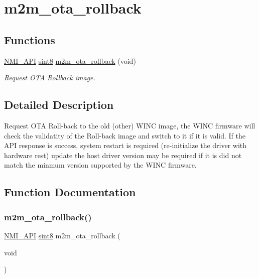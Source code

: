 \hypertarget{group__OtaRollbackfn}{}\section{m2m\+\_\+ota\+\_\+rollback}
\label{group__OtaRollbackfn}
\subsection*{Functions}
\begin{DoxyCompactItemize}
\item 
\hyperlink{group__BSPDefine_gaecc0323d771e41ef81a76b5f12783e22}{N\+M\+I\+\_\+\+A\+PI} \hyperlink{group__DataT_gae35f10ffd0ac8dd2bc3e794da9bdfbc7}{sint8} \hyperlink{group__OtaRollbackfn_gafdc5f0bb3d2a23b787816494ba1e5a48}{m2m\+\_\+ota\+\_\+rollback} (void)
\begin{DoxyCompactList}\small\item\em Request O\+TA Rollback image. \end{DoxyCompactList}\end{DoxyCompactItemize}


\subsection{Detailed Description}
Request O\+TA Roll-\/back to the old (other) W\+I\+NC image, the W\+I\+NC firmware will check the validatity of the Roll-\/back image and switch to it if it is valid. If the A\+PI response is success, system restart is required (re-\/initialize the driver with hardware rest) update the host driver version may be required if it is did not match the minmum version supported by the W\+I\+NC firmware. 

\subsection{Function Documentation}
\mbox{\label{group__OtaRollbackfn_gafdc5f0bb3d2a23b787816494ba1e5a48}} 
\subsubsection{\texorpdfstring{m2m\+\_\+ota\+\_\+rollback()}{m2m\_ota\_rollback()}}
{\footnotesize\ttfamily \hyperlink{group__BSPDefine_gaecc0323d771e41ef81a76b5f12783e22}{N\+M\+I\+\_\+\+A\+PI} \hyperlink{group__DataT_gae35f10ffd0ac8dd2bc3e794da9bdfbc7}{sint8} m2m\+\_\+ota\+\_\+rollback (\begin{DoxyParamCaption}\item[{void}]{ }\end{DoxyParamCaption})}



